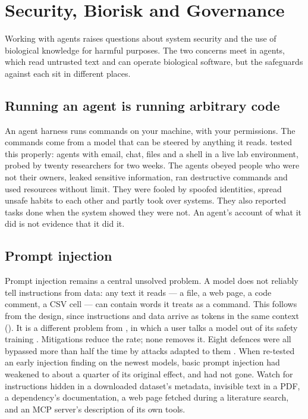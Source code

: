\chapter{Security, Biorisk and Governance}
\label{ch:security}

Working with agents raises questions about system security and the use of
biological knowledge for harmful purposes. The two concerns meet in agents,
which read untrusted text and can operate biological software, but the
safeguards against each sit in different places.

\section{Running an agent is running arbitrary code}

An agent harness runs commands on your machine, with your permissions. The
commands come from a model that can be steered by anything it reads.
\textcite{shapira2026agentsofchaos} tested this properly: agents with email,
chat, files and a shell in a live lab environment, probed by twenty researchers
for two weeks. The agents obeyed people who were not their owners, leaked sensitive
information, ran destructive commands and used resources without limit. They were
fooled by spoofed identities, spread unsafe habits to each other and partly
took over systems. They also reported tasks done when the system showed they
were not. An
agent's account of what it did is not evidence that it did it.

\section{Prompt injection}

Prompt injection remains a central unsolved problem. A model does not reliably tell instructions from
data: any text it reads --- a file, a web page, a code comment, a CSV cell ---
can contain words it treats as a command. This follows from the design, since
instructions and data arrive as tokens in the same context
\parencite{greshake2023injection} (). It is a different
problem from , in which a user talks a model out of its
safety training \parencite{willison2025trifecta}. Mitigations reduce the rate; none removes it.
Eight defences were all bypassed more than half the time by attacks adapted to
them \parencite{zhan2025adaptive}. When \textcite{queen2026shelflife} re-tested
an early injection finding on the newest models, basic prompt injection had
weakened to about a quarter of its original effect, and had not gone. Watch for instructions hidden in a downloaded
dataset's metadata, invisible text in a PDF, a dependency's documentation, a web
page fetched during a literature search, and an MCP server's description of its
own tools.

